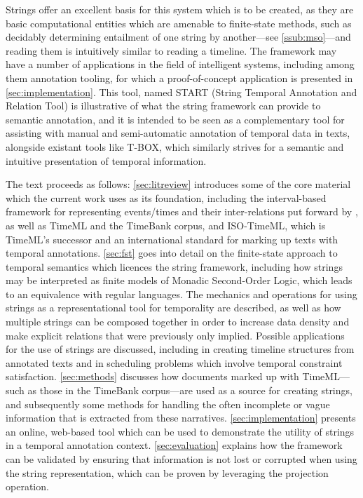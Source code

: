 \documentclass[a4paper,12pt,leqno]{article}
\begin{document}
Strings offer an excellent basis for this system which is to be created, as they are basic computational entities which are amenable to finite-state methods, such as decidably determining entailment of one string by another---see \cref{ssub:mso}---and reading them is intuitively similar to reading a timeline. The framework may have a number of applications in the field of intelligent systems, including among them annotation tooling, for which a proof-of-concept application is presented in \cref{sec:implementation}. This tool, named START (String Temporal Annotation and Relation Tool) is illustrative of what the string framework can provide to semantic annotation, and it is intended to be seen as a complementary tool for assisting with manual and semi-automatic annotation of temporal data in texts, alongside existant tools like T-BOX, which similarly strives for a semantic and intuitive presentation of temporal information.

The text proceeds as follows: \cref{sec:litreview} introduces some of the core material which the current work uses as its foundation, including the interval-based framework for representing events/times and their inter-relations put forward by \citet{allen1983maintaining}, as well as TimeML and the TimeBank corpus, and ISO-TimeML, which is TimeML's successor and an international standard for marking up texts with temporal annotations. \cref{sec:fst} goes into detail on the finite-state approach to temporal semantics which licences the string framework, including how strings may be interpreted as finite models of Monadic Second-Order Logic, which leads to an equivalence with regular languages. The mechanics and operations for using strings as a representational tool for temporality are described, as well as how multiple strings can be composed together in order to increase data density and make explicit relations that were previously only implied. Possible applications for the use of strings are discussed, including in creating timeline structures from annotated texts and in scheduling problems which involve temporal constraint satisfaction. \cref{sec:methods} discusses how documents marked up with TimeML---such as those in the TimeBank corpus---are used as a source for creating strings, and subsequently some methods for handling the often incomplete or vague information that is extracted from these narratives. \cref{sec:implementation} presents an online, web-based tool which can be used to demonstrate the utility of strings in a temporal annotation context. \cref{sec:evaluation} explains how the framework can be validated by ensuring that information is not lost or corrupted when using the string representation, which can be proven by leveraging the projection operation.
\newpage
\end{document}
